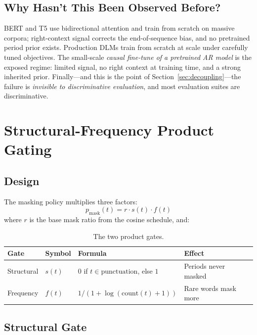\documentclass{article}
\begin{document}
\subsection{Why Hasn't This Been Observed Before?}
\label{sec:whybefore}

BERT and T5 use bidirectional attention and train from scratch on massive corpora;
right-context signal corrects the end-of-sequence bias, and no pretrained period prior
exists. Production DLMs train from scratch at scale under carefully tuned objectives.
The small-scale \emph{causal fine-tune of a pretrained AR model} is the exposed regime:
limited signal, no right context at training time, and a strong inherited prior.
Finally---and this is the point of Section~\ref{sec:decoupling}---the failure is
\emph{invisible to discriminative evaluation}, and most evaluation suites are
discriminative.


\section{Structural-Frequency Product Gating}
\label{sec:gate}

\subsection{Design}

The masking policy multiplies three factors:
\begin{equation}
p_{\text{mask}}(t) = r \cdot s(t) \cdot f(t)
\label{eq:gate}
\end{equation}
where $r$ is the base mask ratio from the cosine schedule, and:

\begin{table}[h]
\centering
\begin{tabular}{llll}
\toprule
Gate & Symbol & Formula & Effect \\
\midrule
Structural & $s(t)$ & $0$ if $t \in \text{punctuation}$, else $1$ & Periods never masked \\
Frequency & $f(t)$ & $1 / (1 + \log(\text{count}(t) + 1))$ & Rare words mask more \\
\bottomrule
\end{tabular}
\caption{The two product gates.}
\label{tab:gates}
\end{table}

\subsection{Structural Gate}
\end{document}
